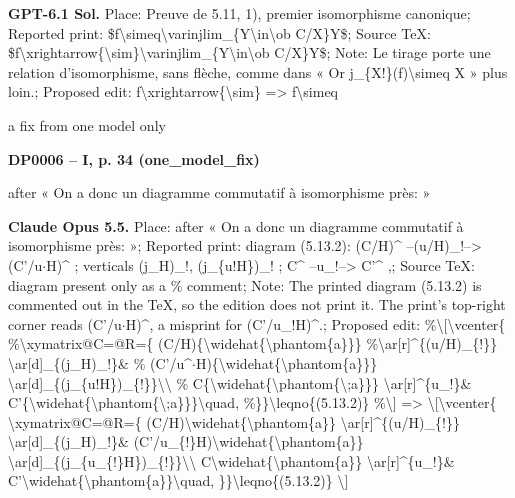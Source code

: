 \textbf{GPT-6.1 Sol.} Place: Preuve de 5.11, 1), premier isomorphisme canonique; Reported print: \$f\textbackslash{}simeq\textbackslash{}varinjlim\_\{Y\textbackslash{}in\textbackslash{}ob C/X\}Y\$; Source TeX: \$f\textbackslash{}xrightarrow\{\textbackslash{}sim\}\textbackslash{}varinjlim\_\{Y\textbackslash{}in\textbackslash{}ob C/X\}Y\$; Note: Le tirage porte une relation d'isomorphisme, sans flèche, comme dans « Or j\_\{X!\}(f)\textbackslash{}simeq X » plus loin.; Proposed edit: f\textbackslash{}xrightarrow\{\textbackslash{}sim\} =\allowbreak > f\textbackslash{}simeq\par
a fix from one model only\par
\par\noindent\hypertarget{DP0006}{}\textbf{DP0006 -- I, p. 34 (one\_model\_fix)}\par
after « On a donc un diagramme commutatif à isomorphisme près: »\par
\textbf{Claude Opus 5.5.} Place: after « On a donc un diagramme commutatif à isomorphisme près: »; Reported print: diagram (5.13.2): (C/H)\textasciicircum{} --(u/H)\_!--> (C'/u\ensuremath{\cdot}H)\textasciicircum{} ; verticals (j\_H)\_!, (j\_\{u!H\})\_! ; C\textasciicircum{} --u\_!--> C'\textasciicircum{} ,; Source TeX: diagram present only as a \% comment; Note: The printed diagram (5.13.2) is commented out in the TeX, so the edition does not print it. The print's top-right corner reads (C'/u\ensuremath{\cdot}H)\textasciicircum{}, a misprint for (C'/u\_!H)\textasciicircum{}.; Proposed edit: \%\textbackslash{}[\textbackslash{}vcenter\{ \%\textbackslash{}xymatrix@C=\allowbreak 2.5cm@R=\allowbreak 1.5cm\{ (C/H)\{\textbackslash{}widehat\{\textbackslash{}phantom\{a\}\}\} \%\textbackslash{}ar[r]\textasciicircum{}\{(u/H)\_\{!\}\} \textbackslash{}ar[d]\_\{(j\_H)\_!\}\& \%  (C'/u\textasciicircum{}\ensuremath{\cdot}H)\{\textbackslash{}widehat\{\textbackslash{}phantom\{a\}\}\} \textbackslash{}ar[d]\_\{(j\_\{u!H\})\_\{!\}\}\textbackslash{}\textbackslash{} \%  C\{\textbackslash{}widehat\{\textbackslash{}phantom\{\textbackslash{};a\}\}\} \textbackslash{}ar[r]\textasciicircum{}\{u\_!\}\& C'\{\textbackslash{}widehat\{\textbackslash{}phantom\{\textbackslash{};a\}\}\}\textbackslash{}quad, \%\}\}\textbackslash{}leqno\{(5.13.2)\} \%\textbackslash{}] =\allowbreak > \textbackslash{}[\textbackslash{}vcenter\{ \textbackslash{}xymatrix@C=\allowbreak 2.5cm@R=\allowbreak 1.5cm\{ (C/H)\textbackslash{}widehat\{\textbackslash{}phantom\{a\}\} \textbackslash{}ar[r]\textasciicircum{}\{(u/H)\_\{!\}\} \textbackslash{}ar[d]\_\{(j\_H)\_!\}\&   (C'/u\_\{!\}H)\textbackslash{}widehat\{\textbackslash{}phantom\{a\}\} \textbackslash{}ar[d]\_\{(j\_\{u\_\{!\}H\})\_\{!\}\}\textbackslash{}\textbackslash{}   C\textbackslash{}widehat\{\textbackslash{}phantom\{a\}\} \textbackslash{}ar[r]\textasciicircum{}\{u\_!\}\& C'\textbackslash{}widehat\{\textbackslash{}phantom\{a\}\}\textbackslash{}quad, \}\}\textbackslash{}leqno\{(5.13.2)\} \textbackslash{}]\par
